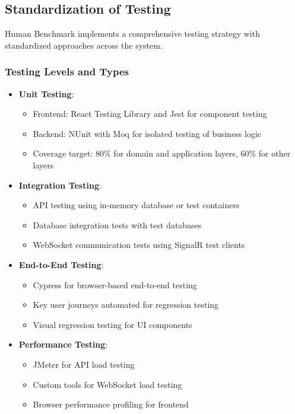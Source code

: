 \subsection{Standardization of Testing}

Human Benchmark implements a comprehensive testing strategy with standardized approaches across the system.

\subsubsection{Testing Levels and Types}

\begin{itemize}
    \item \textbf{Unit Testing}:
    \begin{itemize}
        \item Frontend: React Testing Library and Jest for component testing
        \item Backend: NUnit with Moq for isolated testing of business logic
        \item Coverage target: 80\% for domain and application layers, 60\% for other layers
    \end{itemize}
    
    \item \textbf{Integration Testing}:
    \begin{itemize}
        \item API testing using in-memory database or test containers
        \item Database integration tests with test databases
        \item WebSocket communication tests using SignalR test clients
    \end{itemize}
    
    \item \textbf{End-to-End Testing}:
    \begin{itemize}
        \item Cypress for browser-based end-to-end testing
        \item Key user journeys automated for regression testing
        \item Visual regression testing for UI components
    \end{itemize}
    
    \item \textbf{Performance Testing}:
    \begin{itemize}
        \item JMeter for API load testing
        \item Custom tools for WebSocket load testing
        \item Browser performance profiling for frontend
    \end{itemize}
    

\end{itemize}
